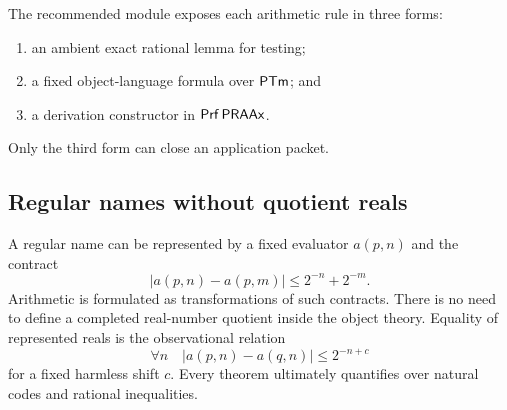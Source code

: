 The recommended module exposes each arithmetic rule in three forms:
\begin{enumerate}[label=(\roman*)]
\item an ambient exact rational lemma for testing;
\item a fixed object-language formula over \(\mathsf{PTm}\); and
\item a derivation constructor in \(\mathsf{Prf}\,\mathsf{PRAAx}\).
\end{enumerate}
Only the third form can close an application packet.

\subsection{Regular names without quotient reals}

A regular name can be represented by a fixed evaluator \(a(p,n)\) and the
contract
\[
 |a(p,n)-a(p,m)|\le2^{-n}+2^{-m}.
\]
Arithmetic is formulated as transformations of such contracts.  There is no
need to define a completed real-number quotient inside the object theory.
Equality of represented reals is the observational relation
\[
 \forall n\quad |a(p,n)-a(q,n)|\le 2^{-n+c}
\]
for a fixed harmless shift \(c\).  Every theorem ultimately quantifies over
natural codes and rational inequalities.
